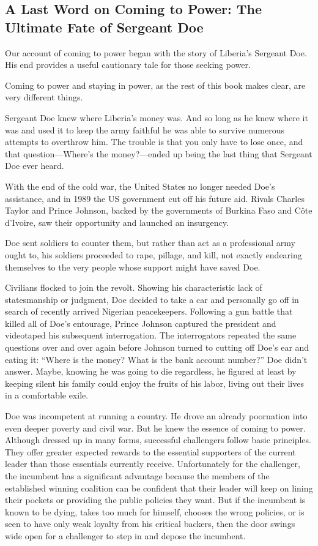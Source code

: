 \documentclass[10pt]{article}
\begin{document}
\subsection{A Last Word on Coming to Power: The Ultimate Fate of Sergeant Doe}

{\large Our account of coming to power began with the story of Liberia's
Sergeant Doe. His end provides a useful cautionary tale for those seeking power.}

{\large Coming to power and staying in power, as the rest of this book makes
clear, are very different things.}

{\large Sergeant Doe knew where Liberia's money was. And so long as he knew
where it was and used it to keep the army faithful he was able to survive
numerous attempts to overthrow him. The trouble is that you only have to lose
once, and that question---Where's the money?---ended up being the last thing that
Sergeant Doe ever heard.}

{\large With the end of the cold war, the United States no longer needed Doe's
assistance, and in 1989 the US government cut off his future aid. Rivals Charles
Taylor and Prince Johnson, backed by the governments of Burkina Faso and C\^{o}te
d'Ivoire, saw their opportunity and launched an insurgency.}

{\large Doe sent soldiers to counter them, but rather than act as a professional
army ought to, his soldiers proceeded to rape, pillage, and kill, not exactly
endearing themselves to the very people whose support might have saved Doe.}

{\large Civilians flocked to join the revolt. Showing his characteristic lack of
statesmanship or judgment, Doe decided to take a car and personally go off in
search of recently arrived Nigerian peacekeepers. Following a gun battle that
killed all of Doe's entourage, Prince Johnson captured the president and
videotaped his subsequent interrogation. The interrogators repeated the same
questions over and over again before Johnson turned to cutting off Doe's ear and
eating it: ``Where is the money? What is the bank account number?'' Doe didn't
answer. Maybe, knowing he was going to die regardless, he figured at least by
keeping silent his family could enjoy the fruits of his labor, living out their
lives in a comfortable exile.}

{\large Doe was incompetent at running a country. He drove an already poornation
into even deeper poverty and civil war. But he knew the essence of coming to
power. Although dressed up in many forms, successful challengers follow basic
principles. They offer greater expected rewards to the essential supporters of
the current leader than those essentials currently receive. Unfortunately for the
challenger, the incumbent has a significant advantage because the members of the
established winning coalition can be confident that their leader will keep on
lining their pockets or providing the public policies they want. But if the
incumbent is known to be dying, takes too much for himself, chooses the wrong
policies, or is seen to have only weak loyalty from his critical backers, then
the door swings wide open for a challenger to step in and depose the incumbent.}
\end{document}
